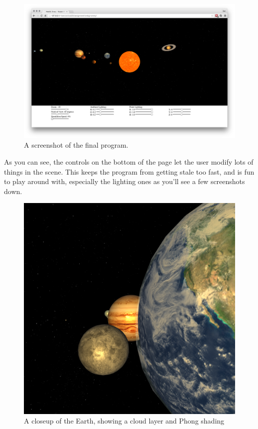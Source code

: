 \documentclass{scrreprt}
\begin{document}
\begin{figure}[H]
\includegraphics[width=\textwidth]{images/screenshot}
\caption{A screenshot of the final program.}
\end{figure}

As you can see, the controls on the bottom of the page let the user modify lots of things in the scene. This keeps the program from getting stale too fast, and is fun to play around with, especially the lighting ones as you'll see a few screenshots down.

\begin{figure}[H]
\includegraphics[width=\textwidth]{images/earthcloseup}
\caption{A closeup of the Earth, showing a cloud layer and Phong shading}
\end{figure}
\end{document}
